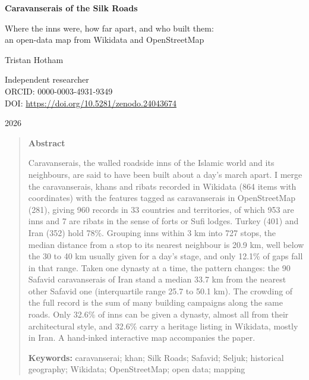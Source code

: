 \documentclass[11pt,a4paper]{article}
\begin{document}
\begin{center}
{\Large\bfseries Caravanserais of the Silk Roads\par}
\vspace{0.4em}
{\large Where the inns were, how far apart, and who built them:\\an open-data map from Wikidata and OpenStreetMap\par}
\vspace{1.2em}
{\large Tristan Hotham\par}
\vspace{0.3em}
{\small Independent researcher\\
ORCID: 0000-0003-4931-9349\\
DOI: \href{https://doi.org/10.5281/zenodo.24043674}{https://doi.org/10.5281/zenodo.24043674}\par}
\vspace{0.8em}
2026
\end{center}

\begin{quote}
\small
\begin{center}\textbf{Abstract}\end{center}
Caravanserais, the walled roadside inns of the Islamic world and its neighbours, are said to have been built about a day's march apart. I merge the caravanserais, khans and ribats recorded in Wikidata (864 items with coordinates) with the features tagged as caravanserais in OpenStreetMap (281), giving 960 records in 33 countries and territories, of which 953 are inns and 7 are ribats in the sense of forts or Sufi lodges. Turkey (401) and Iran (352) hold 78\%. Grouping inns within 3 km into 727 stops, the median distance from a stop to its nearest neighbour is 20.9 km, well below the 30 to 40 km usually given for a day's stage, and only 12.1\% of gaps fall in that range. Taken one dynasty at a time, the pattern changes: the 90 Safavid caravanserais of Iran stand a median 33.7 km from the nearest other Safavid one (interquartile range 25.7 to 50.1 km). The crowding of the full record is the sum of many building campaigns along the same roads. Only 32.6\% of inns can be given a dynasty, almost all from their architectural style, and 32.6\% carry a heritage listing in Wikidata, mostly in Iran. A hand-inked interactive map accompanies the paper.

\textbf{Keywords:} caravanserai; khan; Silk Roads; Safavid; Seljuk; historical geography; Wikidata; OpenStreetMap; open data; mapping
\end{quote}
\end{document}
